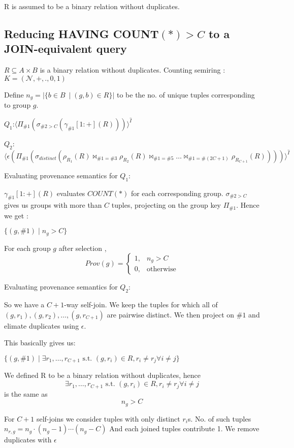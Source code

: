 \documentclass[twocolumn]{article}
\begin{document}
R is assumed to be a binary relation without duplicates.


\subsection{Reducing HAVING COUNT$(*) > C$ to a JOIN-equivalent query}

$R \subseteq  A \times B$ is a binary relation without duplicates.
Counting semiring : $K = (\mathcal{N}, +, ., 0, 1)$

Define $n_g = |\{b \in B\ \mid (g,b) \in R\}|$ to be the no. of unique tuples corresponding to group $g$.

$Q_1$:$\langle\Pi_{\#1}(\sigma_{\#2>C}(\gamma_{\#1}[1:+](R)))\rangle^{\hat I}$

$Q_2$: $\langle \epsilon(\Pi_{\#1}(\sigma_{distinct}(\rho_{R_1}(R)\bowtie_{\#1=\#3} \rho_{R_2}(R)\bowtie_{\#1=\#5}\dots\bowtie_{\#1=\#(2C+1)}\rho_{R_{C+1}}(R))))\rangle^{\hat I}$

Evaluating provenance semantics for $Q_1$:

$\gamma_{\#1}[1:+](R)$ evaluates $COUNT(*)$ for each corresponding group. $\sigma_{\#2>C}$ gives us groups with more than $C$ tuples, projecting on the group key $\Pi_{\#1}$.
Hence we get :

$\{ (g,\#1) \mid n_g > C \}$

For each group $g$ after selection ,
$$Prov(g) = \begin{cases}
   1, & n_g > C \\
   0, & \text{otherwise}
   \end{cases}$$

Evaluating provenance semantics for $Q_2$:

So we have a $C+1$-way self-join.
We keep the tuples for which  all of $(g,r_1),(g,r_2),\dots,(g,r_{C+1})$ are pairwise distinct. We then project on $\#1$ and elimate duplicates using $\epsilon$.

This basically gives us:

$\{(g,\#1) \mid \exists r_1,\dots,r_{C+1} \text{  s.t. } (g,r_i) \in R, r_i\neq r_j \forall i \neq j  \}$

We defined R to be a binary relation without duplicates, hence $$\exists r_1,\dots,r_{C+1} \text{  s.t. } (g,r_i) \in R, r_i\neq r_j \forall i \neq j $$ is the same as $$n_g>C$$


For $C+1$ self-joins we consider tuples with only distinct $r_i$s.
No. of such tuples $n_{r, g}= n_g \cdot (n_g-1) \cdots (n_g - C)$
And each joined tuples contribute 1. 
We remove duplicates with $\epsilon$
\end{document}
